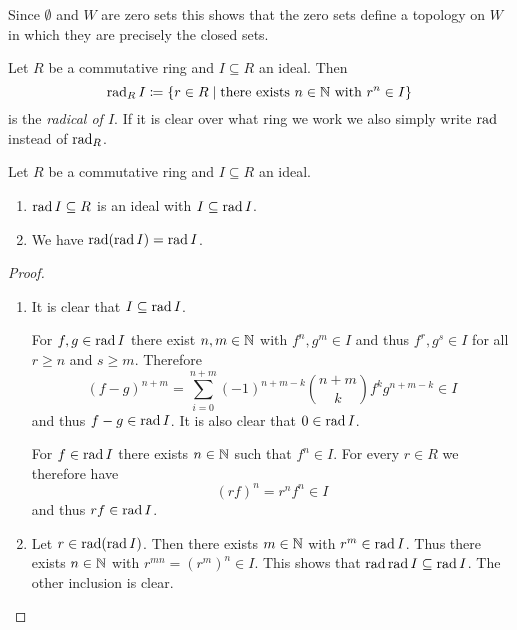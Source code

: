 \begin{remark}
  Since $\emptyset$ and $W$ are zero sets this shows that the zero sets define a topology on $W$ in which they are precisely the closed sets.
\end{remark}


\begin{definition}
  Let $R$ be a commutative ring and $I \subseteq R$ an ideal. Then
  \[
              \operatorname{rad}_R I
    \coloneqq \{
                r \in R
              \mid
                \text{there exists }
                n \in \mathbb{N}
                \text{ with }
                r^n \in I
              \}
  \]
  is the \emph{radical of $I$}.
  If it is clear over what ring we work we also simply write $\operatorname{rad}$ instead of $\operatorname{rad}_R$.
\end{definition}


\begin{lemma}
  Let $R$ be a commutative ring and $I \subseteq R$ an ideal. 
  \begin{enumerate}[label=\emph{\alph*)},leftmargin=*]
    \item
      $\operatorname{rad} I  \subseteq R$ is an ideal with $I \subseteq \operatorname{rad} I$.
    \item
      We have $\operatorname{rad}(\operatorname{rad} I) = \operatorname{rad} I$.
  \end{enumerate}
\end{lemma}
\begin{proof}
  \begin{enumerate}[label=\emph{\alph*)},leftmargin=*]
    \item
      It is clear that $I \subseteq \operatorname{rad} I$.
      
      For $f,g \in \operatorname{rad} I$ there exist $n,m \in \mathbb{N}$ with $f^n, g^m \in I$ and thus $f^r, g^s \in I$ for all $r \geq n$ and $s \geq m$. Therefore
      \[
            (f - g)^{n+m}
        =   \sum_{i=0}^{n+m} (-1)^{n+m-k} \binom{n+m}{k} f^k g^{n+m-k}
        \in I
      \]
      and thus $f-g \in \operatorname{rad} I$. It is also clear that $0 \in \operatorname{rad} I$.
      
      For $f \in \operatorname{rad} I$ there exists $n \in \mathbb{N}$ such that $f^n \in I$.
      For every $r \in R$ we therefore have
      \[
            (rf)^n
        =   r^n f^n
        \in I
      \]
      and thus $rf \in \operatorname{rad} I$.
    \item
      Let $r \in \operatorname{rad}(\operatorname{rad} I)$.
      Then there exists $m \in \mathbb{N}$ with $r^m \in \operatorname{rad} I$.
      Thus there exists $n \in \mathbb{N}$ with $r^{mn} = (r^m)^n \in I$.
      This shows that $\operatorname{rad} \operatorname{rad} I \subseteq \operatorname{rad} I$.
      The other inclusion is clear.
    \qedhere
  \end{enumerate}
\end{proof}


